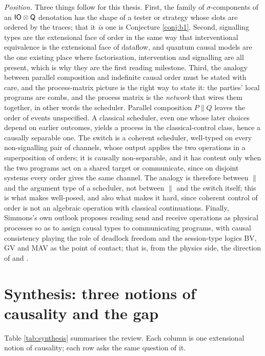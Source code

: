 \emph{Position.} Three things follow for this thesis. First, the family of $\sigma$-components of an $\mathsf{IO}\otimes\mathsf{Q}$ denotation has the shape of a tester or strategy whose slots are ordered by the traces; that it \emph{is} one is Conjecture \ref{conj:b1}. Second, signalling types are the extensional face of order in the same way that interventional equivalence is the extensional face of dataflow, and quantum causal models are the one existing place where factorisation, intervention and signalling are all present, which is why they are the first reading milestone. Third, the analogy between parallel composition and indefinite causal order must be stated with care, and the process-matrix picture is the right way to state it: the parties' local programs are combs, and the process matrix is the \emph{network} that wires them together, in other words the scheduler. Parallel composition $P\parallel Q$ leaves the order of events unspecified. A classical scheduler, even one whose later choices depend on earlier outcomes, yields a process in the classical-control class, hence a causally separable one. The switch is a coherent scheduler, well-typed on every non-signalling pair of channels, whose output applies the two operations in a superposition of orders; it is causally non-separable, and it has content only when the two programs act on a shared target or communicate, since on disjoint systems every order gives the same channel. The analogy is therefore between $\parallel$ and the argument type of a scheduler, not between $\parallel$ and the switch itself; this is what makes  well-posed, and also what makes it hard, since coherent control of order is not an algebraic operation with classical continuations. Finally, Simmons's own outlook \cite{simmons2024thesis} proposes reading send and receive operations as physical processes so as to assign causal types to communicating programs, with causal consistency playing the role of deadlock freedom and the session-type logics BV, GV and MAV as the point of contact; that is, from the physics side, the direction of  and .

\section{Synthesis: three notions of causality and the gap}\label{sec:synthesis}

Table \ref{tab:synthesis} summarises the review. Each column is one extensional notion of causality; each row asks the same question of it.

